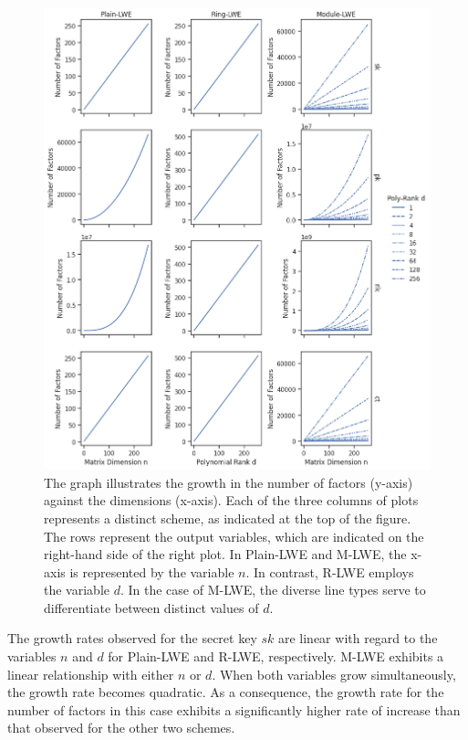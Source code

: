 \begin{figure}[ht!]
  \centering
  \includegraphics[scale=0.52]{images/OutputFactors.png}
  \caption[Output Variable Factors by Scheme]{The graph illustrates the growth in the number of factors (y-axis) against the dimensions (x-axis). Each of the three columns of plots represents a distinct scheme, as indicated at the top of the figure. The rows represent the output variables, which are indicated on the right-hand side of the right plot. In Plain-LWE and M-LWE, the x-axis is represented by the variable $n$. In contrast, R-LWE employs the variable $d$. In the case of M-LWE, the diverse line types serve to differentiate between distinct values of $d$.}
  \label{fig:OutputFactors}
\end{figure}

The growth rates observed for the secret key $sk$ are linear with regard to the variables $n$ and $d$ for Plain-LWE and R-LWE, respectively. M-LWE exhibits a linear relationship with either $n$ or $d$. When both variables grow simultaneously, the growth rate becomes quadratic. As a consequence, the growth rate for the number of factors in this case exhibits a significantly higher rate of increase than that observed for the other two schemes.

